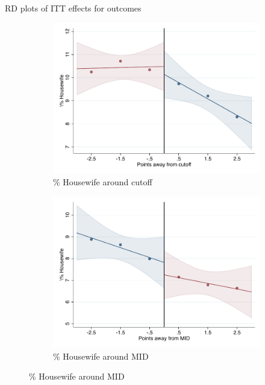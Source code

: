 \documentclass[notes,11pt, aspectratio=169]{beamer}
\begin{document}
\begin{frame}{RD plots of ITT effects for outcomes}
\hyperlink{ITT_rd_plot_IPN}{}
\begin{figure}

    \begin{subfigure}{0.45\textwidth}
        \centering
        \caption{\% Housewife around cutoff}
        \includegraphics[width=\textwidth]{04_Figures/rd_plot_tau_Housewife_IPN3.pdf}
    \end{subfigure}
    \begin{subfigure}{0.45\textwidth}
        \centering
        \caption{\% Housewife around MID}
        \includegraphics[width=\textwidth]{04_Figures/rd_plot_mid_Housewife_IPN3.pdf}
    \end{subfigure}
    
\end{figure}
\end{frame}
\end{document}
